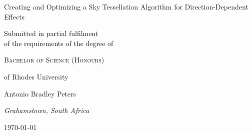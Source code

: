 \begin{titlepage}
  \centering
 {\huge Creating and Optimizing a Sky Tessellation Algorithm for Direction-Dependent Effects\par}
  \vspace{2cm}
  {\Large Submitted in partial fulfilment\\of the requirements of the degree of \par}
  \vspace{0.5cm}
  {\scshape\Large Bachelor of Science (Honours)\par}
  \vspace{0.5cm}
  {\Large of Rhodes University \par}
  \vfill
  {\LARGE Antonio Bradley Peters\par}
  \vfill
  {\large \itshape Grahamstown, South Africa}\par
  {\large \today\par}
\end{titlepage}
